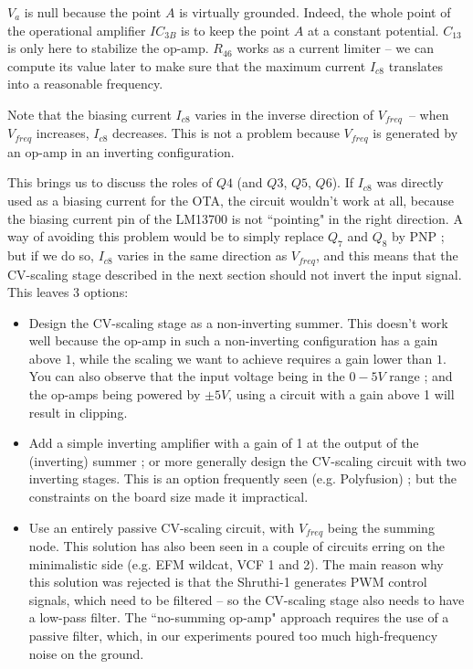 \documentclass[a4paper,11pt]{article}
\begin{document}
$V_a$ is null because the point $A$ is virtually grounded. Indeed, the whole point of the operational amplifier $IC_{3B}$ is to keep the point $A$ at a constant potential. $C_{13}$ is only here to stabilize the op-amp. $R_{46}$ works as a current limiter -- we can compute its value later to make sure that the maximum current $I_{c8}$ translates into a reasonable frequency.

Note that the biasing current $I_{c8}$ varies in the inverse direction of $V_{freq}$~-- when $V_{freq}$ increases, $I_{c8}$ decreases. This is not a problem because $V_{freq}$ is generated by an op-amp in an inverting configuration.

This brings us to discuss the roles of $Q4$ (and $Q3$, $Q5$, $Q6$). If $I_{c8}$ was directly used as a biasing current for the OTA, the circuit wouldn't work at all, because the biasing current pin of the LM13700 is not ``pointing" in the right direction. A way of avoiding this problem would be to simply replace $Q_7$ and $Q_8$ by PNP ; but if we do so, $I_{c8}$ varies in the same direction as $V_{freq}$, and this means that the CV-scaling stage described in the next section should not invert the input signal. This leaves 3 options:

\begin{itemize}
\item Design the CV-scaling stage as a non-inverting summer. This doesn't work well because the op-amp in such a non-inverting configuration has a gain above $1$, while the scaling we want to achieve requires a gain lower than $1$. You can also observe that the input voltage being in the $0-5V$ range ; and the op-amps being powered by $\pm 5V$, using a circuit with a gain above 1 will result in clipping.
\item Add a simple inverting amplifier with a gain of 1 at the output of the (inverting) summer ; or more generally design the CV-scaling circuit with two inverting stages. This is an option frequently seen (e.g. Polyfusion) ; but the constraints on the board size made it impractical.
\item Use an entirely passive CV-scaling circuit, with $V_{freq}$ being the summing node. This solution has also been seen in a couple of circuits erring on the minimalistic side (e.g. EFM wildcat, VCF 1 and 2). The main reason why this solution was rejected is that the Shruthi-1 generates PWM control signals, which need to be filtered -- so the CV-scaling stage also needs to have a low-pass filter. The ``no-summing op-amp" approach requires the use of a passive filter, which, in our experiments poured too much high-frequency noise on the ground.
\end{itemize}
\end{document}

